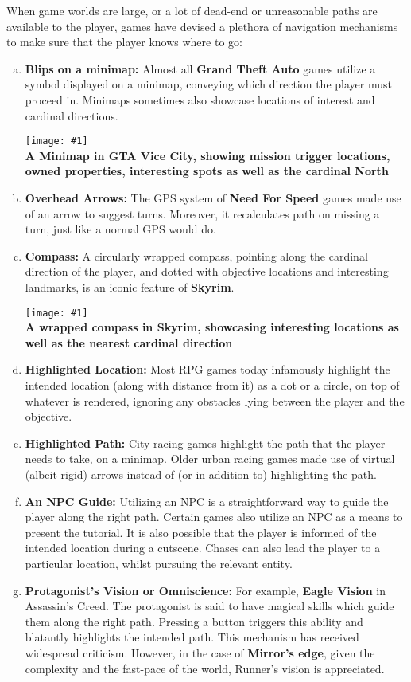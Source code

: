 \documentclass[12pt]{article}
\newcommand{\point}[1]{\item \textbf{#1:}}
\newcommand{\fig}[3]{\begin{center} \texttt{[image: \#1]}\\ \textbf{#3} \end{center}}
\begin{document}
When game worlds are large, or a lot of dead-end or unreasonable paths are available to the player, games have devised a plethora of navigation mechanisms to make sure that the player knows where to go:

\begin{enumerate}[a)]

\point{Blips on a minimap} Almost all \textbf{Grand Theft Auto} games utilize a symbol displayed on a minimap, conveying which direction the player must proceed in. Minimaps sometimes also showcase locations of interest and cardinal directions.

\fig{gta_minimap}{1.3}{A Minimap in GTA Vice City, showing mission trigger locations, owned properties, interesting spots as well as the cardinal North}

\point{Overhead Arrows} The GPS system of \textbf{Need For Speed} games made use of an arrow to suggest turns. Moreover, it recalculates path on missing a turn, just like a normal GPS would do.

\point{Compass} A circularly wrapped compass, pointing along the cardinal direction of the player, and dotted with objective locations and interesting landmarks, is an iconic feature of \textbf{Skyrim}.

\fig{skyrim_compass}{1.3}{A wrapped compass in Skyrim, showcasing interesting locations as well as the nearest cardinal direction}

\point{Highlighted Location} Most RPG games today infamously highlight the intended location (along with distance from it) as a dot or a circle, on top of whatever is rendered, ignoring any obstacles lying between the player and the objective.

\point{Highlighted Path} City racing games highlight the path that the player needs to take, on a minimap. Older urban racing games made use of virtual (albeit rigid) arrows instead of (or in addition to) highlighting the path.

\point{An NPC Guide} Utilizing an NPC is a straightforward way to guide the player along the right path. Certain games also utilize an NPC as a means to present the tutorial. It is also possible that the player is informed of the intended location during a cutscene. Chases can also lead the player to a particular location, whilst pursuing the relevant entity.

\point{Protagonist's Vision or Omniscience} For example, \textbf{Eagle Vision} in Assassin's Creed. The protagonist is said to have magical skills which guide them along the right path. Pressing a button triggers this ability and blatantly highlights the intended path. This mechanism has received widespread criticism. However, in the case of \textbf{Mirror's edge}, given the complexity and the fast-pace of the world, Runner's vision is appreciated.


\end{enumerate}
\end{document}
